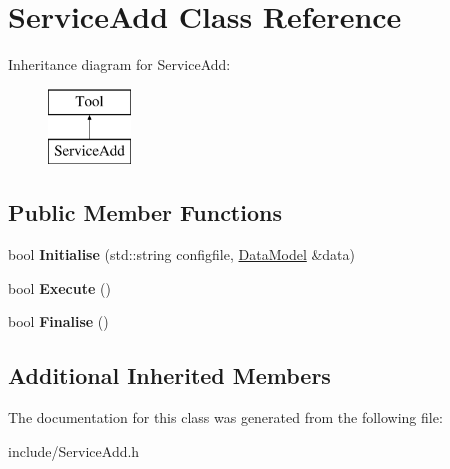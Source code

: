 \hypertarget{classServiceAdd}{\section{Service\-Add Class Reference}
\label{classServiceAdd}
}
Inheritance diagram for Service\-Add\-:\begin{figure}[H]
\begin{center}
\leavevmode
\includegraphics[height=2.000000cm]{classServiceAdd}
\end{center}
\end{figure}
\subsection*{Public Member Functions}
\begin{DoxyCompactItemize}
\item 
\hypertarget{classServiceAdd_a047e44c3d209591703b0bdec1b1b51cd}{bool {\bfseries Initialise} (std\-::string configfile, \hyperlink{classDataModel}{Data\-Model} \&data)}\label{classServiceAdd_a047e44c3d209591703b0bdec1b1b51cd}

\item 
\hypertarget{classServiceAdd_a4908df063074b02e73e589d9f07998ac}{bool {\bfseries Execute} ()}\label{classServiceAdd_a4908df063074b02e73e589d9f07998ac}

\item 
\hypertarget{classServiceAdd_a2e4d3854bcd490935e6e9d39597c7204}{bool {\bfseries Finalise} ()}\label{classServiceAdd_a2e4d3854bcd490935e6e9d39597c7204}

\end{DoxyCompactItemize}
\subsection*{Additional Inherited Members}


The documentation for this class was generated from the following file\-:\begin{DoxyCompactItemize}
\item 
include/Service\-Add.\-h\end{DoxyCompactItemize}
